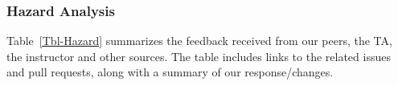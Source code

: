 \documentclass{article}
\begin{document}
\begin{longtable}{|p{2cm}|p{4cm}|p{5cm}|p{4cm}|}
\hline
\end{longtable}

\subsubsection{Hazard Analysis}

Table~\ref{Tbl-Hazard} summarizes the feedback received from our peers, the TA,
the instructor and other sources.  The table includes links to the related
issues and pull requests, along with a summary of our response/changes.
\end{document}
